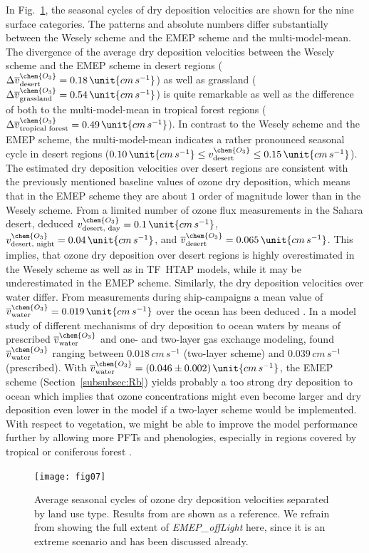 \documentclass[gmd, manuscript]{copernicus}
\begin{document}
In Fig.~\ref{fig:mmm_drydep_season_pft}, the seasonal cycles of dry deposition velocities are shown for the nine surface categories. The patterns and absolute numbers differ substantially between the Wesely scheme and the EMEP scheme and the multi-model-mean. The divergence of the average dry deposition velocities between the Wesely scheme and the EMEP scheme in desert regions ($\Delta \overline{v}_\text{desert}^\chem{O_3} = 0.18\,\unit{cm\,s^{-1}}$) as well as grassland ($\Delta \overline{v}_\text{grassland}^\chem{O_3} = 0.54\,\unit{cm\,s^{-1}}$) is quite remarkable as well as the difference of both to the multi-model-mean in tropical forest regions ($\Delta \overline{v}_\text{tropical forest}^\chem{O_3} = 0.49\,\unit{cm\,s^{-1}}$). In contrast to the Wesely scheme and the EMEP scheme, the multi-model-mean indicates a rather pronounced seasonal cycle in desert regions ($0.10\,\unit{cm\,s^{-1}} \leq v^\chem{O_3}_\text{desert}\leq 0.15\,\unit{cm\,s^{-1}}$). The estimated dry deposition velocities over desert regions are consistent with the previously mentioned baseline values of ozone dry deposition, which means that in the EMEP scheme they are about $1$ order of magnitude lower than in the Wesely scheme. From a limited number of ozone flux measurements in the Sahara desert, \citet{AE:Gusten1995} deduced $v^\chem{O_3}_\text{desert, day} = 0.1\,\unit{cm\,s^{-1}}$, $v^\chem{O_3}_\text{desert, night} = 0.04\,\unit{cm\,s^{-1}}$, and $\overline{v}^\chem{O_3}_\text{desert} = 0.065\,\unit{cm\,s^{-1}}$. This implies, that ozone dry deposition over desert regions is highly overestimated in the Wesely scheme as well as in TF~HTAP models, while it may be underestimated in the EMEP scheme. Similarly, the dry deposition velocities over water differ. From measurements during ship-campaigns a mean value of $\overline{v}^\chem{O_3}_\text{water} = 0.019\,\unit{cm\,s^{-1}}$ over the ocean has been deduced \citep{JGR:Helmig2012}. In a model study of different mechanisms of dry deposition to ocean waters by means of prescribed $\overline{v}_\text{water}^\chem{O_3}$ and one- and two-layer gas exchange modeling, \citet{ACP:Luhar2017} found $\overline{v}_\text{water}^\chem{O_3}$ ranging between $0.018\,\unit{cm\,s^{-1}}$ (two-layer scheme) and $0.039\,\unit{cm\,s^{-1}}$ (prescribed). With $\overline{v}^\chem{O_3}_\text{water} = (0.046\pm0.002)\,\unit{cm\,s^{-1}}$, the EMEP scheme (Section~\ref{subsubsec:Rb}) yields probably a too strong dry deposition to ocean which implies that ozone concentrations might even become larger and dry deposition even lower in the model if a two-layer scheme would be implemented. With respect to vegetation, we might be able to improve the model performance further by allowing more PFTs and phenologies, especially in regions covered by tropical or coniferous forest \citep{GCB:Anav2017}. 
%
\begin{figure}[t]
  \texttt{[image: fig07]}
  \caption{Average seasonal cycles of ozone dry deposition velocities separated by land use type. Results from \citep{ACP:Hardacre2015} are shown as a reference. We refrain from showing the full extent of \emph{EMEP\_offLight} here, since it is an extreme scenario and has been discussed already.}
  \label{fig:mmm_drydep_season_pft}
\end{figure}
%
\end{document}
